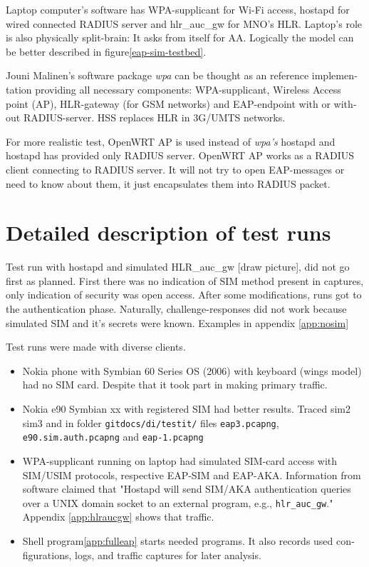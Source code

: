 \documentclass[12pt,a4paper,english]{tutthesis}
\begin{document}
\begin{otherlanguage}{english}
Laptop computer's software has WPA-supplicant for Wi-Fi access,
hostapd for wired connected RADIUS server and hlr\_auc\_gw for MNO's
HLR. Laptop's role is also physically split-brain: It asks  from
itself for AA. Logically the model can be better described in
figure\ref{eap-sim-testbed}.


Jouni Malinen's software package \emph{wpa} can be thought as an reference
implementation providing all necessary components: WPA-supplicant, Wireless
Access point (AP), HLR-gateway (for GSM networks) and EAP-endpoint with
or without RADIUS-server. HSS replaces HLR in 3G/UMTS networks.

For more realistic test, OpenWRT AP is used instead of \emph{wpa's} hostapd
and hostapd has provided only RADIUS server.
OpenWRT AP works as a RADIUS client connecting to RADIUS server. 
It will not try to open EAP-messages or need
to know about them, it just encapsulates them into RADIUS packet.

\section{Detailed description of test runs}
\label{sec-5-2}



Test run with hostapd and simulated HLR\_auc\_gw [draw picture], did
not go first as planned. First there was no indication of SIM method
present in captures, only indication of security was open access.
After some modifications, runs got to the authentication phase.
Naturally, challenge-responses did not work 
because simulated SIM and it's secrets were known. 
Examples in appendix \ref{app:nosim}   



Test runs were made with diverse clients.
\begin{itemize}
\item Nokia phone with Symbian 60 Series OS (2006) with keyboard
(wings model) had no SIM card. Despite that it took part in making
primary traffic.
\item Nokia e90 Symbian xx with registered SIM had better results. Traced
sim2 sim3 and in folder \verb~gitdocs/di/testit/~ files \verb~eap3.pcapng~,
\verb~e90.sim.auth.pcapng~ and \verb~eap-1.pcapng~
\item WPA-supplicant running on laptop had simulated SIM-card access
with SIM/USIM protocols, respective EAP-SIM and EAP-AKA.  
Information from software claimed that "Hostapd
will send SIM/AKA authentication queries over a UNIX domain socket
to an external program, e.g., \verb~hlr_auc_gw~." Appendix \ref{app:hlraucgw}
shows that traffic.
\end{itemize}
\begin{itemize}
\item Shell program\ref{app:fulleap} starts needed programs. It also records used configurations,
logs, and traffic captures for later analysis.
\end{itemize}


\end{otherlanguage}
\end{document}
